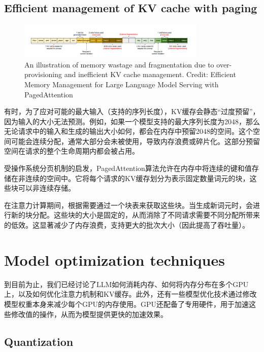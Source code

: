 \documentclass[twocolumn, 10pt]{article} %
\theoremstyle{remark}
\begin{document}
\subsection{Efficient management of KV cache with paging}
\begin{figure}[ht]
    \centering
    \includegraphics[width=0.8\textwidth]{memory-wastage-fragmentation-inefficient-kv-cache.png}
    \caption{An illustration of memory wastage and fragmentation due to over-provisioning and inefficient KV cache management. Credit: Efficient Memory Management for Large Language Model Serving with PagedAttention}
\end{figure}

有时，为了应对可能的最大输入（支持的序列长度），KV缓存会静态“过度预留”，因为输入的大小无法预测。例如，如果一个模型支持的最大序列长度为2048，那么无论请求中的输入和生成的输出大小如何，都会在内存中预留2048的空间。这个空间可能会连续分配，通常大部分会未被使用，导致内存浪费或碎片化。这部分预留空间在请求的整个生命周期内都会被占用。

受操作系统分页机制的启发，PagedAttention算法允许在内存中将连续的键和值存储在非连续的空间中。它将每个请求的KV缓存划分为表示固定数量词元的块，这些块可以非连续存储。

在注意力计算期间，根据需要通过一个块表来获取这些块。当生成新词元时，会进行新的块分配。这些块的大小是固定的，从而消除了不同请求需要不同分配所带来的低效。这显著减少了内存浪费，支持更大的批次大小（因此提高了吞吐量）。


\section{Model optimization techniques}



到目前为止，我们已经讨论了LLM如何消耗内存、如何将内存分布在多个GPU上，以及如何优化注意力机制和KV缓存。此外，还有一些模型优化技术通过修改模型权重本身来减少每个GPU的内存使用。GPU还配备了专用硬件，用于加速这些修改值的操作，从而为模型提供更快的加速效果。

\subsection{Quantization}
\end{document}
